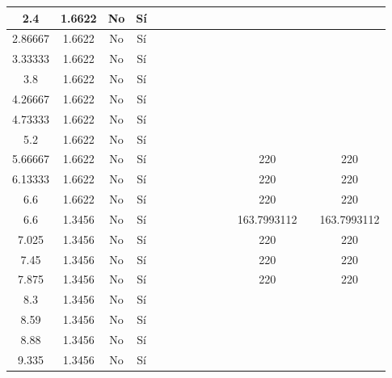 \begin{table}[H]
{\begin{tabular}{|c|c|c|c|c|c|c|c|c|c|c|c|c|c|}
\hline
2.4 & 1.6622 & No  & Sí  &     &     &     &     &     &     &     &     &     &  \bigstrut\\
\hline
2.86667 & 1.6622 & No  & Sí  &     &     &     &     &     &     &     &     &     &  \bigstrut\\
\hline
3.33333 & 1.6622 & No  & Sí  &     &     &     &     &     &     &     &     &     &  \bigstrut\\
\hline
3.8 & 1.6622 & No  & Sí  &     &     &     &     &     &     &     &     &     &  \bigstrut\\
\hline
4.26667 & 1.6622 & No  & Sí  &     &     &     &     &     &     &     &     &     &  \bigstrut\\
\hline
4.73333 & 1.6622 & No  & Sí  &     &     &     &     &     &     &     &     &     &  \bigstrut\\
\hline
5.2 & 1.6622 & No  & Sí  &     &     &     &     &     &     &     &     &     &  \bigstrut\\
\hline
5.66667 & 1.6622 & No  & Sí  &     &     &     &     &     &     &     & 220 &     & 220 \bigstrut\\
\hline
6.13333 & 1.6622 & No  & Sí  &     &     &     &     &     &     &     & 220 &     & 220 \bigstrut\\
\hline
6.6 & 1.6622 & No  & Sí  &     &     &     &     &     &     &     & 220 &     & 220 \bigstrut\\
\hline
6.6 & 1.3456 & No  & Sí  &     &     &     &     &     &     &     & 163.7993112 &     & 163.7993112 \bigstrut\\
\hline
7.025 & 1.3456 & No  & Sí  &     &     &     &     &     &     &     & 220 &     & 220 \bigstrut\\
\hline
7.45 & 1.3456 & No  & Sí  &     &     &     &     &     &     &     & 220 &     & 220 \bigstrut\\
\hline
7.875 & 1.3456 & No  & Sí  &     &     &     &     &     &     &     & 220 &     & 220 \bigstrut\\
\hline
8.3 & 1.3456 & No  & Sí  &     &     &     &     &     &     &     &     &     &  \bigstrut\\
\hline
8.59 & 1.3456 & No  & Sí  &     &     &     &     &     &     &     &     &     &  \bigstrut\\
\hline
8.88 & 1.3456 & No  & Sí  &     &     &     &     &     &     &     &     &     &  \bigstrut\\
\hline
9.335 & 1.3456 & No  & Sí  &     &     &     &     &     &     &     &     &     &  \bigstrut\\

\end{tabular}}
\end{table}
